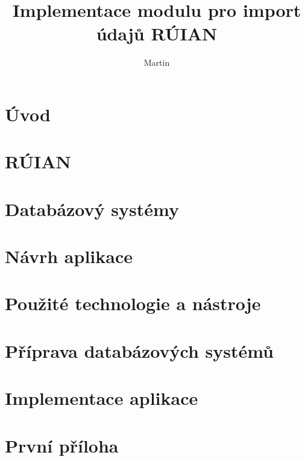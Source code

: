 \documentclass[czech, kiv, ba, he, iso690numb, pdf]{fasthesis}
\title{Implementace modulu pro import údajů RÚIAN}
\author{Martin}{Schön}{}{}
\begin{document}
\frontpages[tm]
\tableofcontents

\chapter{Úvod}


\chapter{RÚIAN}


\chapter{Databázový systémy}


\chapter{Návrh aplikace}


\chapter{Použité technologie a nástroje}


\chapter{Příprava databázových systémů}


\chapter{Implementace aplikace}








 
\appendix
\chapter{První příloha}
\backmatter
\printbibliography
\setbackpageqrcode
\backpage
\end{document}
